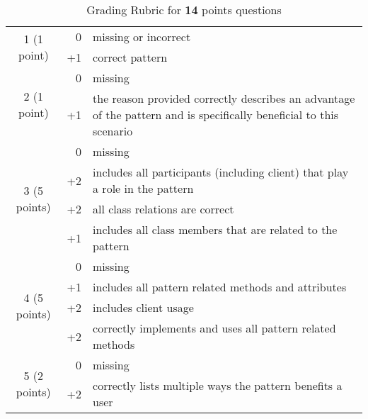 \begin{table}[h]
	\caption{Grading Rubric for {\bf 14} points questions}
	\label{rubric14}
    \centering
    \begin{tabular}{|c|r|p{}|}
        \hline
	    \multirow{2}{*}{1 (1 point)} & 0 & missing or incorrect \\
	    \cline{2-3}
	    & +1 & correct pattern \\
        \hline
	    \multirow{2}{*}{2 (1 point)} & 0 & missing \\
	    \cline{2-3}
	    & +1 & the reason provided correctly describes an advantage of the pattern and is specifically beneficial to this scenario \\
        \hline
	    \multirow{4}{*}{3 (5 points)} & 0 & missing \\
	    \cline{2-3}
	    & +2 & includes all participants (including client) that play a role in the pattern \\
	    \cline{2-3}
	    & +2 & all class relations are correct \\
	    \cline{2-3}
	    & +1 & includes all class members that are related to the pattern \\
        \hline
	    \multirow{4}{*}{4 (5 points)} & 0 & missing \\
	    \cline{2-3}
	    & +1 & includes all pattern related methods and attributes \\
	    \cline{2-3}
	    & +2 & includes client usage \\
	    \cline{2-3}
	    & +2 & correctly implements and uses all pattern related methods \\
        \hline
	    \multirow{2}{*}{5 (2 points)} & 0 & missing \\
	    \cline{2-3}
	    & +2 & correctly lists multiple ways the pattern benefits a user \\
        \hline
    \end{tabular}
\end{table}
